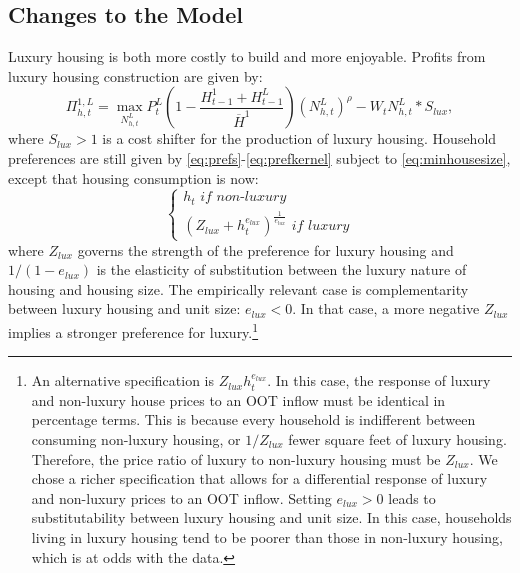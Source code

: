 \documentclass[letterpaper,12pt,dvipsnames,usenames]{article}
\theoremstyle{definition}
\begin{document}
\begin{spacing}{1.25}
{\subsection{Changes to the Model}
Luxury housing is both more costly to build and more enjoyable. Profits from luxury housing construction are given by:
\begin{equation}
\Pi_{h,t}^{1,L}=\max_{N_{h,t}^L}P_{t}^{L}\left(1-\frac{H_{t-1}^{1}+H_{t-1}^{L}}{\overline{H}^{1}}\right)\left(N_{h,t}^{L}\right)^{\rho}-W_{t}N_{h,t}^{L}*S_{lux}, \label{eq:profitL}
\end{equation}
where $S_{lux}>1$ is a cost shifter for the production of luxury housing. Household preferences are still given by \eqref{eq:prefs}-\eqref{eq:prefkernel} subject to \eqref{eq:minhousesize}, except that housing consumption is now:
\[\left\{\begin{array}{l} h_t \textit{ if non-luxury} \\
\left( Z_{lux} + h_t^{e_{lux}}\right)^{\frac{1}{e_{lux}}} \textit{ if luxury}
\end{array}\right.\]
where $Z_{lux}$ governs the strength of the preference for luxury housing and $1/(1-e_{lux})$ is the elasticity of substitution between the luxury nature of housing and housing size. The empirically relevant case is complementarity between luxury housing and unit size: $e_{lux}<0$. In that case, a more negative $Z_{lux}$ implies a stronger preference for luxury.\footnote{An alternative specification is $Z_{lux}h_{t}^{e_{lux}}$. In this case, the response of luxury and non-luxury house prices to an OOT inflow must be identical in percentage terms. This is because every household is indifferent between consuming non-luxury housing, or $1/Z_{lux}$ fewer square feet of luxury housing. Therefore, the price ratio of luxury to non-luxury housing must be $Z_{lux}$. We chose a richer specification that allows for a differential response of luxury and non-luxury prices to an OOT inflow. Setting $e_{lux}>0$ leads to substitutability between luxury housing and unit size. In this case, households living in luxury housing tend to be poorer than those in non-luxury housing, which is at odds with the data.}

}
\end{spacing}
\end{document}
